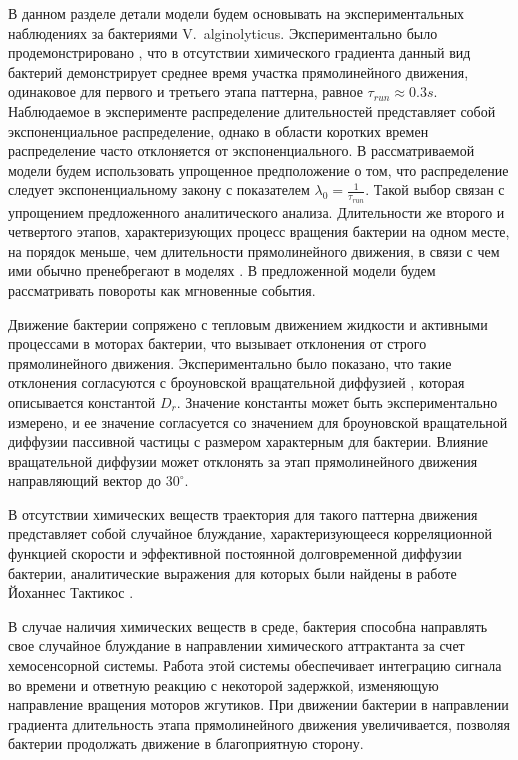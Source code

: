 В данном разделе детали модели будем основывать на экспериментальных наблюдениях за бактериями V.~alginolyticus. Экспериментально было продемонстрировано \cite{altindal_implications_2011}, что в отсутствии химического градиента данный вид бактерий демонстрирует среднее время участка прямолинейного движения, одинаковое для первого и третьего этапа паттерна, равное $\tau_{run} \approx 0.3s$. Наблюдаемое в эксперименте распределение длительностей представляет собой экспоненциальное распределение, однако в области коротких времен распределение часто отклоняется от экспоненциального. В рассматриваемой модели будем использовать упрощенное предположение о том, что распределение следует экспоненциальному закону с показателем $\lambda_0=\frac{1}{\tau_{run}}$. Такой выбор связан с упрощением предложенного аналитического анализа. Длительности же второго и четвертого этапов, характеризующих процесс вращения бактерии на одном месте, на порядок меньше, чем длительности прямолинейного движения, в связи с чем ими обычно пренебрегают в моделях \cite{block_adaptation_1983}. В предложенной модели будем рассматривать повороты как мгновенные события.

Движение бактерии сопряжено с тепловым движением жидкости и активными процессами в моторах бактерии, что вызывает отклонения от строго прямолинейного движения. Экспериментально было показано, что такие отклонения согласуются с броуновской вращательной диффузией \cite{berg_chemotaxis_1972}, которая описывается константой $D_r$. Значение константы может быть экспериментально измерено, и ее значение согласуется со значением для броуновской вращательной диффузии пассивной частицы с размером характерным для бактерии. Влияние вращательной диффузии может отклонять за этап прямолинейного движения направляющий вектор до $30^\circ$. 

В отсутствии химических веществ траектория для такого паттерна движения представляет собой случайное блуждание, характеризующееся корреляционной функцией скорости и эффективной постоянной долговременной диффузии бактерии, аналитические выражения для которых были найдены в работе Йоханнес Тактикос \cite{taktikos_how_2013}. 

В случае наличия химических веществ в среде, бактерия способна направлять свое случайное блуждание в направлении химического аттрактанта за счет хемосенсорной системы. Работа этой системы обеспечивает интеграцию сигнала во времени и ответную реакцию с некоторой задержкой, изменяющую направление вращения моторов жгутиков. При движении бактерии в направлении градиента длительность этапа прямолинейного движения увеличивается, позволяя бактерии продолжать движение в благоприятную сторону. 

